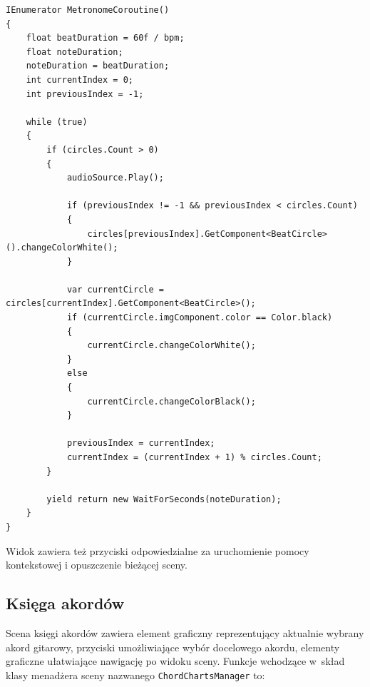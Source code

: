 \begin{lstlisting}[style=sharpcstyle,caption=Wątek \texttt{MetronomeCoroutine}, label=lst:2]
IEnumerator MetronomeCoroutine()
{
    float beatDuration = 60f / bpm;
    float noteDuration;
    noteDuration = beatDuration;
    int currentIndex = 0;
    int previousIndex = -1;

    while (true)
    {
        if (circles.Count > 0)
        {
            audioSource.Play();
            
            if (previousIndex != -1 && previousIndex < circles.Count)
            {
                circles[previousIndex].GetComponent<BeatCircle>().changeColorWhite();
            }
            
            var currentCircle = circles[currentIndex].GetComponent<BeatCircle>();
            if (currentCircle.imgComponent.color == Color.black)
            {
                currentCircle.changeColorWhite();
            }
            else
            {
                currentCircle.changeColorBlack();
            }

            previousIndex = currentIndex;
            currentIndex = (currentIndex + 1) % circles.Count;
        }
        
        yield return new WaitForSeconds(noteDuration);
    }
}
\end{lstlisting}

Widok zawiera też przyciski odpowiedzialne za uruchomienie pomocy kontekstowej i opuszczenie bieżącej sceny.

\subsection{Księga akordów}
Scena księgi akordów zawiera element graficzny reprezentujący aktualnie wybrany akord gitarowy, przyciski umożliwiające wybór docelowego akordu, elementy graficzne ułatwiające nawigację po widoku sceny. Funkcje wchodzące w~skład klasy menadżera sceny nazwanego \texttt{ChordChartsManager} to:

